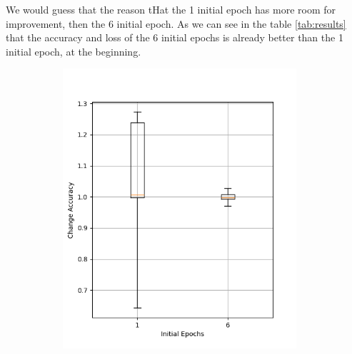 We would guess that the reason tHat the 1 initial epoch has more room for improvement, then the 6 initial epoch.
As we can see in the table \ref{tab:results} that the accuracy and loss of the 6 initial epochs is already better than the 1 initial epoch, at the beginning.
\begin{figure}
    \begin{subfigure}{0.5\textwidth}
        \centering
        \includegraphics[width=0.95\textwidth]{plots/InitEpoch_NotTrained_accuracy.png}
    \end{subfigure}
    \begin{subfigure}{0.5\textwidth}
        \centering

\end{subfigure}
\end{figure}
